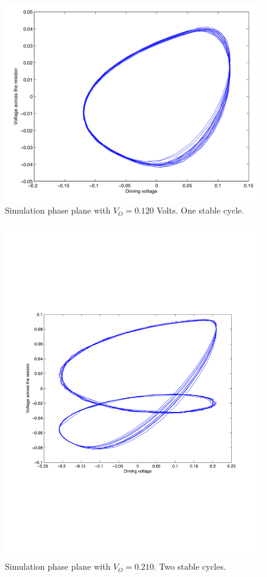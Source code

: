 \documentclass[12pt]{report}
\begin{document}


	\begin{figure}
		\centering
		\includegraphics{simulations/plotnu0120.png}
		\caption{Simulation phase plane with $V_{O}=0.120$ Volts. One stable cycle.}
		\label{fig:sim.0120}
	\end{figure}
	
	\begin{figure}
		\centering
		\includegraphics{simulations/plot0210.pdf}
		\caption{Simulation phase plane with $V_{O}=0.210$. Two stable cycles.}
		\label{fig:sim.0210}
	\end{figure}
\end{document}
